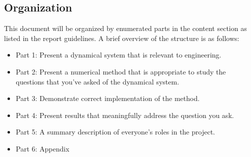 \documentclass[12pt,letterpaper, onecolumn]{exam}
\begin{document}
\subsection{Organization}
This document will be organized by enumerated parts in the content section as listed in the report guidelines. A brief overview of the structure is as follows:

\begin{itemize}
\item Part 1: Present a dynamical system that is relevant to engineering.
\item Part 2: Present a numerical method that is appropriate to study the questions that you've asked of the dynamical system.
\item Part 3: Demonstrate correct implementation of the method.
\item Part 4: Present results that meaningfully address the question you ask.
\item Part 5: A summary description of everyone's roles in the project.
\item Part 6: Appendix
\end{itemize}
\end{document}
